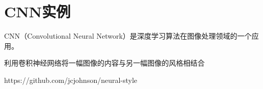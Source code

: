 \section{CNN实例}
CNN（Convolutional Neural Network）是深度学习算法在图像处理领域的一个应用。

利用卷积神经网络将一幅图像的内容与另一幅图像的风格相结合~\cite{Johnson2015}

https://github.com/jcjohnson/neural-style


